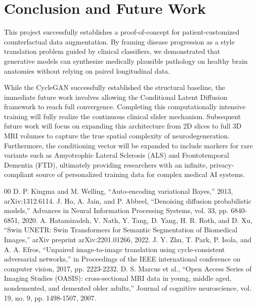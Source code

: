\documentclass[conference]{IEEEtran}
\begin{document}
\section{Conclusion and Future Work}
This project successfully establishes a proof-of-concept for patient-customized counterfactual data augmentation. By framing disease progression as a style translation problem guided by clinical classifiers, we demonstrated that generative models can synthesize medically plausible pathology on healthy brain anatomies without relying on paired longitudinal data.

While the CycleGAN successfully established the structural baseline, the immediate future work involves allowing the Conditional Latent Diffusion framework to reach full convergence. Completing this computationally intensive training will fully realize the continuous clinical slider mechanism. Subsequent future work will focus on expanding this architecture from 2D slices to full 3D MRI volumes to capture the true spatial complexity of neurodegeneration. Furthermore, the conditioning vector will be expanded to include markers for rare variants such as Amyotrophic Lateral Sclerosis (ALS) and Frontotemporal Dementia (FTD), ultimately providing researchers with an infinite, privacy-compliant source of personalized training data for complex medical AI systems.

\begin{thebibliography}{00}
 D. P. Kingma and M. Welling, ``Auto-encoding variational Bayes,'' 2013, arXiv:1312.6114.
 J. Ho, A. Jain, and P. Abbeel, ``Denoising diffusion probabilistic models,'' Advances in Neural Information Processing Systems, vol. 33, pp. 6840-6851, 2020.
 A. Hatamizadeh, V. Nath, Y. Tang, D. Yang, H. R. Roth, and D. Xu, ``Swin UNETR: Swin Transformers for Semantic Segmentation of Biomedical Images,'' arXiv preprint arXiv:2201.01266, 2022.
 J. Y. Zhu, T. Park, P. Isola, and A. A. Efros, ``Unpaired image-to-image translation using cycle-consistent adversarial networks,'' in Proceedings of the IEEE international conference on computer vision, 2017, pp. 2223-2232.
 D. S. Marcus et al., ``Open Access Series of Imaging Studies (OASIS): cross-sectional MRI data in young, middle aged, nondemented, and demented older adults,'' Journal of cognitive neuroscience, vol. 19, no. 9, pp. 1498-1507, 2007.
\end{thebibliography}
\end{document}
